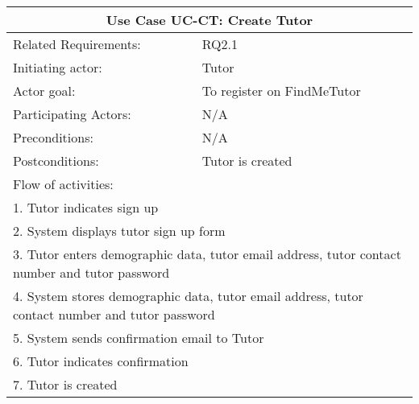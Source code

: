 \documentclass[12pt]{article}
\begin{document}
{\begin{tabular}{| l | l| }
			\hline\multicolumn{2}{|c|}{ \textbf{Use Case UC-CT: Create Tutor}} \\ \hline
			Related Requirements: & RQ2.1 \\ \hline
			Initiating actor: & Tutor \\ \hline
			Actor goal: & To register on FindMeTutor\\ \hline
			Participating Actors: & N/A\\ \hline
			Preconditions: & N/A\\ \hline
			Postconditions: & Tutor is created\\ \hline
			\multicolumn{2}{|l|}{Flow of activities:}\\ \hline
			\multicolumn{2}{|p{15cm}|}{1. Tutor indicates sign up}\\
			\multicolumn{2}{|p{15cm}|}{2. System displays tutor sign up form}\\
			\multicolumn{2}{|p{15cm}|}{3. Tutor enters demographic data, tutor email address, tutor contact number and tutor password}	\\		
			\multicolumn{2}{|p{15cm}|}{4. System stores demographic data, tutor email address, tutor contact number and tutor password}\\
			\multicolumn{2}{|l|}{5. System sends confirmation email to Tutor}\\
			\multicolumn{2}{|l|}{6. Tutor indicates confirmation}	\\
			\multicolumn{2}{|l|}{7. Tutor is created}	
			\\ \hline		
		\end{tabular}



}
\end{document}
